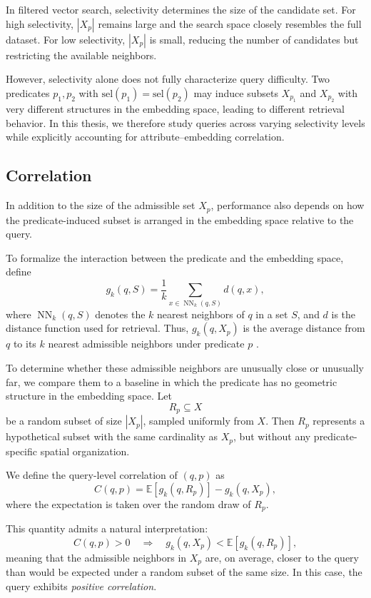 In filtered vector search, selectivity determines the size of the candidate set. For high selectivity, \(|X_p|\) remains large and the search space closely resembles the full dataset. For low selectivity, \(|X_p|\) is small, reducing the number of candidates but restricting the available neighbors.

However, selectivity alone does not fully characterize query difficulty. Two predicates \(p_1, p_2\) with \(\text{sel}(p_1) = \text{sel}(p_2)\) may induce subsets \(X_{p_1}\) and \(X_{p_2}\) with very different structures in the embedding space, leading to different retrieval behavior. In this thesis, we therefore study queries across varying selectivity levels while explicitly accounting for attribute--embedding correlation.

\subsection{Correlation}\label{sec:correlation}

In addition to the size of the admissible set \(X_p\), performance also depends on how the predicate-induced subset is arranged in the embedding space relative to the query.

To formalize the interaction between the predicate and the embedding space, define
\[
g_k(q,S) = \frac{1}{k}\sum_{x \in \operatorname{NN}_k(q,S)} d(q,x),
\]
where \(\operatorname{NN}_k(q,S)\) denotes the \(k\) nearest neighbors of \(q\) in a set \(S\), and \(d\) is the distance function used for retrieval. Thus, \(g_k(q,X_p)\) is the average distance from \(q\) to its \(k\) nearest admissible neighbors under predicate \(p\) \cite{acorn}.

To determine whether these admissible neighbors are unusually close or unusually far, we compare them to a baseline in which the predicate has no geometric structure in the embedding space. Let
\[
R_p \subseteq X
\]
be a random subset of size \(|X_p|\), sampled uniformly from \(X\). Then \(R_p\) represents a hypothetical subset with the same cardinality as \(X_p\), but without any predicate-specific spatial organization.

We define the query-level correlation of \((q,p)\) as
\[
C(q,p) = \mathbb{E}[g_k(q,R_p)] - g_k(q,X_p),
\]
where the expectation is taken over the random draw of \(R_p\).

This quantity admits a natural interpretation:
\[
C(q,p) > 0 \quad \Longrightarrow \quad g_k(q,X_p) < \mathbb{E}[g_k(q,R_p)],
\]
meaning that the admissible neighbors in \(X_p\) are, on average, closer to the query than would be expected under a random subset of the same size. In this case, the query exhibits \emph{positive correlation}.

